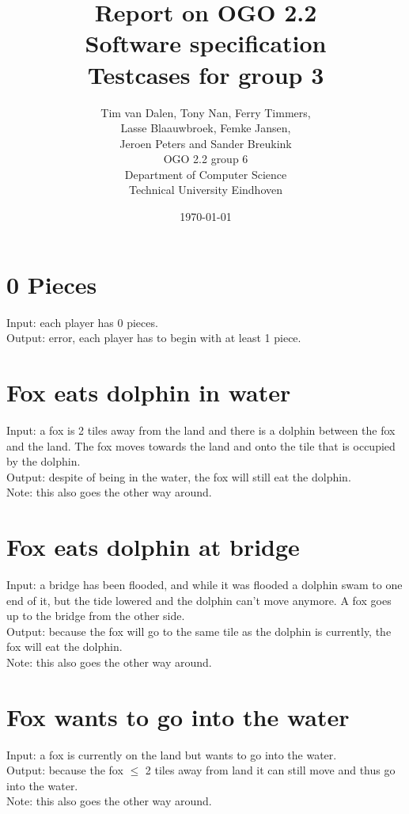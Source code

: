 \documentclass[a4paper,11pt]{article}
\title{Report on OGO 2.2 \\ Software specification\\ Testcases for group 3}
\author{
        Tim van Dalen, Tony Nan, Ferry Timmers, \\ Lasse Blaauwbroek, Femke Jansen, \\Jeroen Peters and Sander Breukink\\ OGO 2.2 group 6 \\
                Department of Computer Science\\
        Technical University Eindhoven\\
}
\date{\today}
\begin{document}
\maketitle
	
	\section{0 Pieces}
    Input: each player has 0 pieces.\\
    Output: error, each player has to begin with at least 1 piece.

	\section{Fox eats dolphin in water}
    Input: a fox is 2 tiles away from the land and there is a dolphin between the fox and the land. The fox moves towards the land and onto the tile that is occupied by the dolphin.\\
    Output: despite of being in the water, the fox will still eat the dolphin.\\
    Note: this also goes the other way around.\\
    
    \section{Fox eats dolphin at bridge}
    Input: a bridge has been flooded, and while it was flooded a dolphin swam to one end of it, but the tide lowered and the dolphin can't move anymore. A fox goes up to the bridge from the other side.\\
    Output: because the fox will go to the same tile as the dolphin is currently, the fox will eat the dolphin.\\
    Note: this also goes the other way around.\\
    
    \section{Fox wants to go into the water}
    Input: a fox is currently on the land but wants to go into the water.\\
    Output: because the fox $\leq$ 2 tiles away from land it can still move and thus go into the water.\\
    Note: this also goes the other way around.\\
\end{document}
